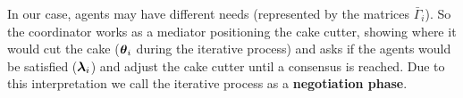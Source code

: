 \documentclass[../main.tex]{subfiles}
\begin{document}
In our case, agents may have different needs (represented by the matrices $\bar{\Gamma}_{i}$).
So the coordinator works as a mediator positioning the cake cutter, showing where it would cut the cake ($\boldsymbol{\theta}_i$ during the iterative process) and asks if the agents would be satisfied ($\boldsymbol{\lambda}_i$) and adjust the cake cutter until a consensus is reached. Due to this interpretation we call the iterative process as a \textbf{negotiation phase}.


\end{document}
